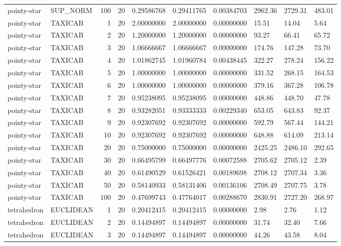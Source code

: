 \begin{longtable}{llrrllllll}
pointy-star & SUP\_NORM & 100 & 20 & 0.29586768 & 0.29411765 & 0.00384703 & 2962.36 & 2729.31 & 483.01 \\
pointy-star & TAXICAB & 1 & 20 & 2.00000000 & 2.00000000 & 0.00000000 & 15.51 & 14.04 & 5.64 \\
pointy-star & TAXICAB & 2 & 20 & 1.20000000 & 1.20000000 & 0.00000000 & 93.27 & 66.41 & 65.72 \\
pointy-star & TAXICAB & 3 & 20 & 1.06666667 & 1.06666667 & 0.00000000 & 174.76 & 147.28 & 73.70 \\
pointy-star & TAXICAB & 4 & 20 & 1.01862745 & 1.01960784 & 0.00438445 & 322.27 & 278.24 & 156.22 \\
pointy-star & TAXICAB & 5 & 20 & 1.00000000 & 1.00000000 & 0.00000000 & 331.52 & 268.15 & 164.53 \\
pointy-star & TAXICAB & 6 & 20 & 1.00000000 & 1.00000000 & 0.00000000 & 379.16 & 367.28 & 106.78 \\
pointy-star & TAXICAB & 7 & 20 & 0.95238095 & 0.95238095 & 0.00000000 & 448.86 & 448.70 & 47.78 \\
pointy-star & TAXICAB & 8 & 20 & 0.93282051 & 0.93333333 & 0.00229340 & 653.05 & 643.83 & 92.37 \\
pointy-star & TAXICAB & 9 & 20 & 0.92307692 & 0.92307692 & 0.00000000 & 592.79 & 567.44 & 144.21 \\
pointy-star & TAXICAB & 10 & 20 & 0.92307692 & 0.92307692 & 0.00000000 & 648.88 & 614.09 & 213.14 \\
pointy-star & TAXICAB & 20 & 20 & 0.75000000 & 0.75000000 & 0.00000000 & 2425.25 & 2486.10 & 292.65 \\
pointy-star & TAXICAB & 30 & 20 & 0.66495799 & 0.66497776 & 0.00072588 & 2705.62 & 2705.12 & 2.39 \\
pointy-star & TAXICAB & 40 & 20 & 0.61490529 & 0.61526421 & 0.00189698 & 2708.12 & 2707.34 & 3.36 \\
pointy-star & TAXICAB & 50 & 20 & 0.58140933 & 0.58131406 & 0.00136106 & 2708.49 & 2707.75 & 3.78 \\
pointy-star & TAXICAB & 100 & 20 & 0.47699743 & 0.47764017 & 0.00288670 & 2830.91 & 2727.20 & 268.97 \\
tetrahedron & EUCLIDEAN & 1 & 20 & 0.20412415 & 0.20412415 & 0.00000000 & 2.98 & 2.76 & 1.12 \\
tetrahedron & EUCLIDEAN & 2 & 20 & 0.14494897 & 0.14494897 & 0.00000000 & 31.74 & 32.40 & 7.66 \\
tetrahedron & EUCLIDEAN & 3 & 20 & 0.14494897 & 0.14494897 & 0.00000000 & 44.26 & 43.58 & 8.04 \\

\end{longtable}
